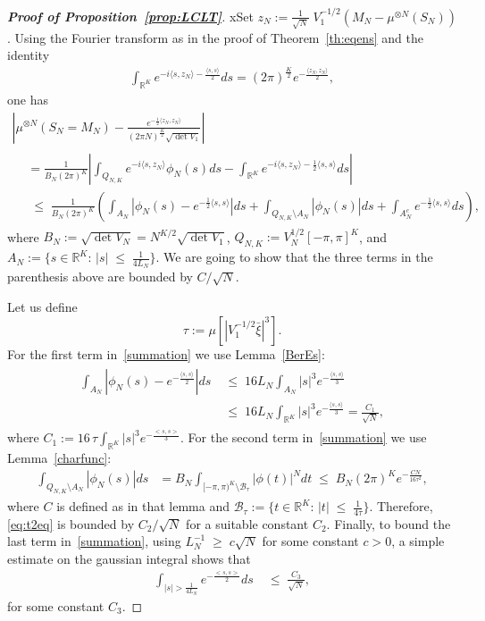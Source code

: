\documentclass[AHL,Unicode,longabstracts,published]{cedram}
\renewcommand{\leq}{\;\leqslant\;}
\renewcommand{\geq}{\;\geqslant\;}
\newcommand{\scalar}[2]{\langle #1, #2\rangle}
\newcommand{\cB}{\mathcal{B}}
\newcommand{\bbR}{\mathbb{R}}
\begin{document}
\begin{proof}[{\bf Proof of Proposition~\ref{prop:LCLT}}]
xSet $z_N:=\frac1{\sqrt N} \;V_1^{-1/2}(M_N - \mu^{\otimes N}(S_N))$. Using the Fourier transform as in the proof of Theorem~\ref{th:eqens} and the identity
\begin{align}
\int_{\bbR^K}e^{-i\scalar{s}{z_N}-\frac{\scalar{s}{s}}{2}}ds = (2\pi)^{\frac{K}{2}}e^{-\frac{\scalar{z_N}{z_N}}{2}},
\end{align}
one has
\begin{multline}\label{summation}
\left |\mu^{\otimes N}\left(S_N = M_N\right)-\frac{e^{-\frac{1}{2}\scalar{z_N}{z_N}}}{(2\pi N)^{\frac{K}{2}}\sqrt{\det V_1}}\right| \\
\begin{aligned}
& = \frac{1}{B_N(2\pi)^K}\left | \int_{Q_{N,K}}e^{-i\scalar{s}{z_N}}\phi_N(s)ds-\int_{\bbR^K}e^{-i\scalar{s}{z_N}-\frac{1}{2}\scalar{s}{s}}ds\right| \\
& \leq \frac{1}{B_N(2\pi)^K}\left(\int_{A_N}\left|\phi_N(s)-e^{-\frac{1}{2}\scalar{s}{s}}\right| ds + \int_{Q_{N,K} \setminus A_N}\left|\phi_N(s)\right|ds + \int_{A_N^c}e^{-\frac{1}{2}\scalar{s}{s}}ds\right),
\end{aligned}
\end{multline}
where $B_N:=\sqrt{\det V_N}=N^{K/2}\sqrt {\det V_1}$, $Q_{N,K}:=V_N^{1/2}[-\pi,\pi]^K$, and $A_{N} := \{s\in\bbR^K:\, |s|\leq \frac{1}{4L_N}\}.$ We are going to show that the three terms in the parenthesis above are bounded by $C/\sqrt N$.

Let us define
\[
\tau:=\mu\left[\left|V_1^{-1/2}\bar{\xi}\right|^3\right].
\]
For the first term in~\eqref{summation} we use Lemma~\ref{BerEs}:
\begin{align}
\begin{split}
\int_{A_{N}}\left|\phi_N(s)-e^{-\frac{\langle s,s\rangle}{2}}\right| ds &\leq 16L_N \int_{A_{N}}|s|^3 e^{-\frac{\langle s,s\rangle}{3}}\\
&\leq16L_N \int_{\bbR^K}|s|^3 e^{-\frac{\langle s,s\rangle}{3}} = \frac{C_1}{\sqrt{N}},
\end{split}
\end{align}
where $C_1 :=16\,\tau\int_{\bbR^K}|s|^3 e^{-\frac{<s,s>}{3}}.$ For the second term in~\eqref{summation} we use Lemma~\ref{charfunc}:
\begin{align}\label{eq:t2eq}
\int_{Q_{N,K} \setminus A_{N}}\left|\phi_N(s)\right|ds &= B_N\int_{[-\pi,\pi)^K \setminus \cB_{\tau}}|\phi(t)|^N dt
\leq B_N(2\pi)^Ke^{-\frac{CN}{16\tau^2}},
\end{align}
where $C$ is defined as in that lemma and $\cB_{\tau}:= \{t\in\bbR^K:\,|t|\leq\frac{1}{4\tau}\}$. Therefore, \eqref{eq:t2eq} is bounded by $C_2/\sqrt N$ for a suitable constant $C_2$. Finally, to bound the last term in~\eqref{summation}, using $L_N^{-1}\geq c\sqrt N$ for some constant $c>0$, a simple estimate on the gaussian integral shows that
\begin{align}
\int_{|s|>\frac{1}{4L_N}}e^{-\frac{<s,s>}{2}}ds & \leq \frac{C_3}{\sqrt N},
\end{align}
for some constant $C_3$.
\end{proof}

\vspace*{30pt}


\end{document}
